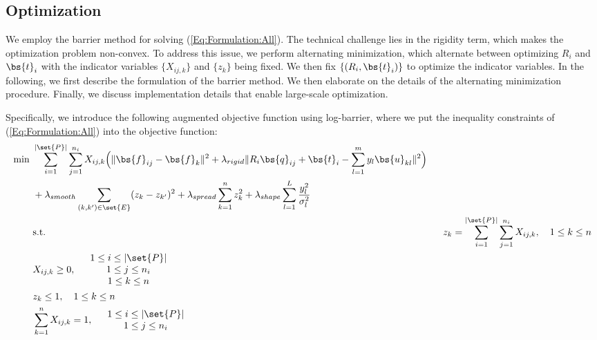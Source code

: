 \subsection{Optimization}
\label{Subsection:Optimization}

We employ the barrier method for solving (\ref{Eq:Formulation:All}). The technical challenge lies in the rigidity term, which makes the optimization problem non-convex. To address this issue, we perform alternating minimization, which alternate between optimizing $R_i$ and $\bs{t}_i$ with the indicator variables $\{X_{ij,k}\}$ and $\{z_k\}$ being fixed. We then fix $\{(R_i,\bs{t}_i)\}$ to optimize the indicator variables. In the following, we first describe the formulation of the barrier method. We then elaborate on the details of the alternating minimization procedure. Finally, we discuss implementation details that enable large-scale optimization.

Specifically, we introduce the following augmented objective function using log-barrier, where we put the inequality constraints of (\ref{Eq:Formulation:All}) into the objective function:
\begin{align}
\underset{}{\min} & \ \sum\limits_{i=1}^{|\set{P}|}\sum\limits_{j=1}^{n_i} X_{ij,k}\Big(\|\bs{f}_{ij}-\bs{f}_k\|^2 + \lambda_{rigid} \|R_i\bs{q}_{ij} + \bs{t}_i - \sum\limits_{l=1}^{m}y_l\bs{u}_{kl}\|^2\Big) \nonumber \\
& \ + \lambda_{smooth} \sum\limits_{(k,k')\in \set{E}}(z_k-z_{k'})^2 + \lambda_{spread} \sum\limits_{k=1}^{n} z_k^2 + \lambda_{shape} \sum\limits_{l=1}^{L} \frac{y_l^2}{\sigma_l^2}\nonumber \\
& \ 
\textup{s.t.}& \ \ z_k = \sum\limits_{i=1}^{|\set{P}|}\sum\limits_{j=1}^{n_i} X_{ij,k},\quad 1\leq k \leq n \nonumber \\
& \ X_{ij,k}\geq 0, \quad 
\begin{array}{c}
1\leq i \leq |\set{P}|\\
1\leq j \leq n_i \\
1\leq k \leq n 
\end{array}
\nonumber \\
& \ z_k \leq 1, \quad 
1\leq k \leq n
\nonumber \\
& \ \sum\limits_{k=1}^n X_{ij,k} = 1, \quad 
\begin{array}{cc}
1\leq i \leq |\set{P}| \\
1\leq j \leq n_i
\end{array}
\label{Eq:Formulation:All2}
\end{align}



